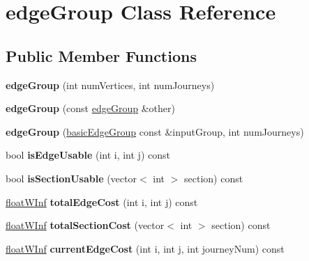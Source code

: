 \hypertarget{classedgeGroup}{
\section{edgeGroup Class Reference}
\label{classedgeGroup}
}
\subsection*{Public Member Functions}
\begin{DoxyCompactItemize}
\item 
\hypertarget{classedgeGroup_a3558582ec5070599d810617edce3a2b1}{
{\bfseries edgeGroup} (int numVertices, int numJourneys)}
\label{classedgeGroup_a3558582ec5070599d810617edce3a2b1}

\item 
\hypertarget{classedgeGroup_aa8eacdd085829fdd9dc41a1136bc2d8d}{
{\bfseries edgeGroup} (const \hyperlink{classedgeGroup}{edgeGroup} \&other)}
\label{classedgeGroup_aa8eacdd085829fdd9dc41a1136bc2d8d}

\item 
\hypertarget{classedgeGroup_aa8e0c7545f5b287e1943e89f22c0f93d}{
{\bfseries edgeGroup} (\hyperlink{classbasicEdgeGroup}{basicEdgeGroup} const \&inputGroup, int numJourneys)}
\label{classedgeGroup_aa8e0c7545f5b287e1943e89f22c0f93d}

\item 
\hypertarget{classedgeGroup_a1cf40b128ba7a7ab65659cf9625be53e}{
bool {\bfseries isEdgeUsable} (int i, int j) const }
\label{classedgeGroup_a1cf40b128ba7a7ab65659cf9625be53e}

\item 
\hypertarget{classedgeGroup_a6f31a667b9489e0d9e8a57fbd198016e}{
bool {\bfseries isSectionUsable} (vector$<$ int $>$ section) const }
\label{classedgeGroup_a6f31a667b9489e0d9e8a57fbd198016e}

\item 
\hypertarget{classedgeGroup_a16b7cc16218597bda7848db94519c653}{
\hyperlink{classfloatWInf}{floatWInf} {\bfseries totalEdgeCost} (int i, int j) const }
\label{classedgeGroup_a16b7cc16218597bda7848db94519c653}

\item 
\hypertarget{classedgeGroup_aee56437a0aef34689f14f88145a65210}{
\hyperlink{classfloatWInf}{floatWInf} {\bfseries totalSectionCost} (vector$<$ int $>$ section) const }
\label{classedgeGroup_aee56437a0aef34689f14f88145a65210}

\item 
\hypertarget{classedgeGroup_a5bd12bbf8d41a06da681ec9029fb7a79}{
\hyperlink{classfloatWInf}{floatWInf} {\bfseries currentEdgeCost} (int i, int j, int journeyNum) const }
\label{classedgeGroup_a5bd12bbf8d41a06da681ec9029fb7a79}


\end{DoxyCompactItemize}
